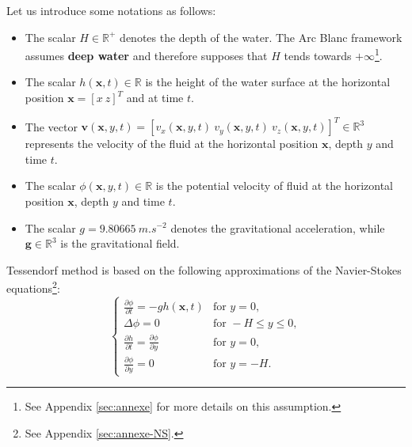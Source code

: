 \documentclass[final]{jcgt}
\def\Framework{The Arc Blanc framework\xspace}
\begin{document}
Let us introduce some notations as follows:
\begin{itemize}
	\item The scalar $H\in\mathbb R^+$ denotes the depth of the water. \Framework assumes \textbf{deep water} and therefore supposes that $H$ tends towards $+\infty$\footnote{See Appendix \ref{sec:annexe} for more details on this assumption.}.
	\item The scalar $h(\mathbf x, t)\in\mathbb R$ is the height of the water surface at the horizontal position $\mathbf x=\left[x~z\right]^T$ and at time $t$.
	\item The vector $\mathbf{v}(\mathbf x, y, t) =  \left[v_x(\mathbf x, y, t)\ v_y(\mathbf x, y, t)\ v_z(\mathbf x, y, t)\right]^T\in\mathbb R^3$ represents the velocity of the fluid at the horizontal position $\mathbf x$, depth $y$ and time $t$.
	\item The scalar $\phi(\mathbf x,y,t)\in\mathbb R$ is the potential velocity of fluid at the horizontal position $\mathbf x$, depth $y$ and time $t$.
	\item The scalar $g=9.80665~m.s^{-2}$ denotes the gravitational acceleration, while $\mathbf g\in\mathbb R^3$ is the gravitational field.
\end{itemize}

Tessendorf method is based on the following approximations of the Navier-Stokes equations\footnote{See Appendix  \ref{sec:annexe-NS}.}:
\begin{equation}
	\label{equa:systemTessendorf}
	\left\lbrace
	\begin{array}{ll}
		\frac{\partial\phi}{\partial t} = -gh(\mathbf x,t)            & \text{for }y=0,            \\
		\Delta\phi=0                                                  & \text{for }-H\leq y\leq 0, \\
		\frac{\partial h}{\partial t}=\frac{\partial\phi}{\partial y} & \text{for }y=0,            \\
		\frac{\partial\phi}{\partial y}=0                             & \text{for }y=-H.
	\end{array}
	\right.
\end{equation}

\end{document}
